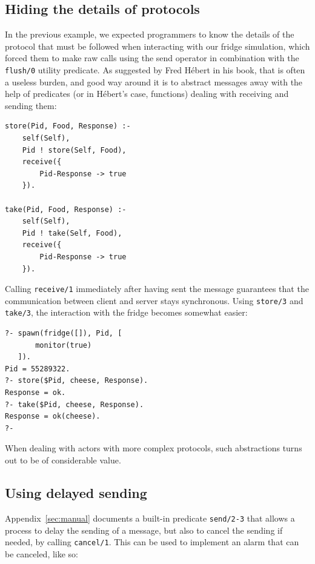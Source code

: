 \subsection{Hiding the details of protocols}\label{sec:hiding-protocol}

\noindent In the previous example, we expected programmers to know the details of the protocol that must be followed when interacting with our fridge simulation, which forced them to make raw calls using the send operator in combination with the \texttt{flush/0} utility predicate. As suggested by Fred H\'ebert in his book, that is often a useless burden, and good way around it is to abstract messages away with the help of predicates (or in H\'ebert's case, functions) dealing with receiving and sending them:

\begin{verbatim}
store(Pid, Food, Response) :-
    self(Self),
    Pid ! store(Self, Food),
    receive({
        Pid-Response -> true
    }).

take(Pid, Food, Response) :-
    self(Self),
    Pid ! take(Self, Food),
    receive({
        Pid-Response -> true
    }).
\end{verbatim}

\noindent Calling \texttt{receive/1} immediately after having sent the message guarantees that the communication between client and server stays synchronous.  Using \texttt{store/3} and \texttt{take/3}, the interaction with the fridge becomes somewhat easier:

\begin{verbatim}
?- spawn(fridge([]), Pid, [
       monitor(true)
   ]).
Pid = 55289322.
?- store($Pid, cheese, Response).
Response = ok.
?- take($Pid, cheese, Response).
Response = ok(cheese).
?-
\end{verbatim}

\noindent When dealing with actors with more complex protocols, such abstractions turns out to be of considerable value. 

\subsection{Using delayed sending}\label{sec:delayed-sending-impl}

Appendix~\ref{sec:manual} documents a built-in predicate \texttt{send/2-3} that allows a process to delay the sending of a message, but also to cancel the sending if needed, by calling \texttt{cancel/1}. This can be used to implement an alarm that can be canceled, like so:

